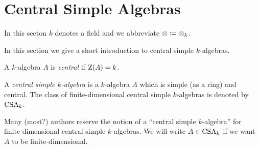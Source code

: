 \section{Central Simple Algebras}


\begin{conventions}
  In this secton $k$ denotes a field and we abbreviate $\mathbin{\otimes} \coloneqq \mathbin{\otimes}_k$.
\end{conventions}


\begin{fluff}
  In this section we give a short introduction to central simple $k$-algebras.
\end{fluff}


\begin{definition}
  A $k$-algebra $A$ is \emph{central} if $\operatorname{Z}(A) = k$.
\end{definition}


\begin{definition}
  A \emph{central simple $k$-algebra} is a $k$-algebra $A$ which is simple (as a ring) and central.
  The class of finite-dimensional central simple $k$-algebras is denoted by $\operatorname{CSA}_k$.
\end{definition}


\begin{remark}
  Many (most?) authors reserve the notion of a \enquote{central simple $k$-algebra} for finite-dimensional central simple $k$-algebras.
  We will write $A \in \operatorname{CSA}_k$ if we want $A$ to be finite-dimensional.
\end{remark}












